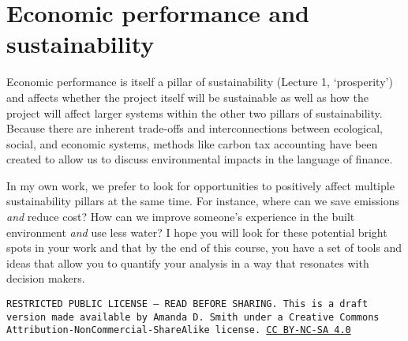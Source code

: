 \documentclass[10pt]{article}
\begin{document}
\section{Economic performance and sustainability}

   {}
\smallskip

Economic performance is itself a pillar of sustainability (Lecture 1, `prosperity') and affects whether the project itself will be sustainable as well as how the project will affect larger systems within the other two pillars of sustainability. Because there are inherent trade-offs and interconnections between ecological, social, and economic systems, methods like carbon tax accounting have been created to allow us to discuss environmental impacts in the language of finance.

In my own work, we prefer to look for opportunities to positively affect multiple sustainability pillars
at the same time. For instance, where can we save emissions \textit{and} reduce cost? How can we improve
someone's experience in the built environment \textit{and} use less water? I hope you will look for these potential
bright spots in your work and that by the end of this course, you have a set of tools and ideas that allow you to quantify your analysis in a way that resonates with decision makers.


\bigskip

\noindent
\texttt{\footnotesize RESTRICTED PUBLIC LICENSE --- READ BEFORE SHARING. This is a draft version made available by Amanda D. Smith under a Creative Commons Attribution-NonCommercial-ShareAlike license. 
\href{https://creativecommons.org/licenses/by-nc-sa/4.0/}{CC BY-NC-SA 4.0}}


\printbibliography
\end{document}
